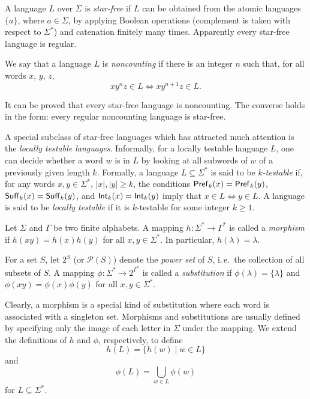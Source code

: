 A language $L$ over $\Sigma$ is \emph{star-free} if $L$ can be obtained from the atomic languages $\{a\}$, where $a \in \Sigma$, by applying Boolean operations (complement is taken with respect to $\Sigma^*$) and catenation finitely many times. Apparently every star-free language is regular.

We say that a language $L$ is \emph{noncounting} if there is an integer $n$ such that, for all words $x$, $y$, $z$, $$x y^n z \in L \Leftrightarrow x y^{n+1} z \in L.$$

It can be proved that every star-free language is noncounting. The converse holds in the form: every regular noncounting language is star-free.

A special subclass of star-free languages which has attracted much attention is the \emph{locally testable languages}. Informally, for a locally testable language $L$, one can decide whether a word $w$ is in $L$ by looking at all subwords of $w$ of a previously given length $k$. Formally, a language $L \subseteq \Sigma^*$ is said to be \emph{$k$-testable} if, for any words $x, y \in \Sigma^*$, $|x|, |y| \ge k$, the conditions $\textup{\sf Pref\/}_k(x) = \textup{\sf Pref\/}_k(y)$, $\textup{\sf Suff\/}_k(x) = \textup{\sf Suff\/}_k(y)$, and $\textup{\sf Int\/}_k(x) = \textup{\sf Int\/}_k(y)$ imply that $x \in L \Leftrightarrow y \in L$. A language is said to be \emph{locally testable} if it is $k$-testable for some integer $k \ge 1$.

Let $\Sigma$ and $\Gamma$ be two finite alphabets. A mapping $h: \Sigma^* \to \Gamma^*$ is called a \emph{morphism} if $h(xy) = h(x) h(y)$ for all $x, y \in \Sigma^*$. In particular, $h(\lambda) = \lambda$.

For a set $S$, let $2^S$ (or $\mathcal{P}(S)$) denote the \emph{power set} of $S$, i.\,e.\ the collection of all subsets of $S$. A mapping $\phi: \Sigma^* \to 2^{\Gamma^*}$ is  called a \emph{substitution} if $\phi(\lambda) = \{\lambda\}$ and $\phi(xy) = \phi(x) \phi(y)$ for all $x, y \in \Sigma^*$.

Clearly, a morphism is a special kind of substitution where each word is associated with a singleton set. Morphisms and substitutions are usually defined by specifying only the image of each letter in $\Sigma$ under the mapping. We extend the definitions of $h$ and $\phi$, respectively, to define $$h(L) = \{h(w) \mid w \in L\}$$ and $$\phi(L) = \bigcup_{w \in L}\phi(w)$$ for $L \subseteq \Sigma^*$.

